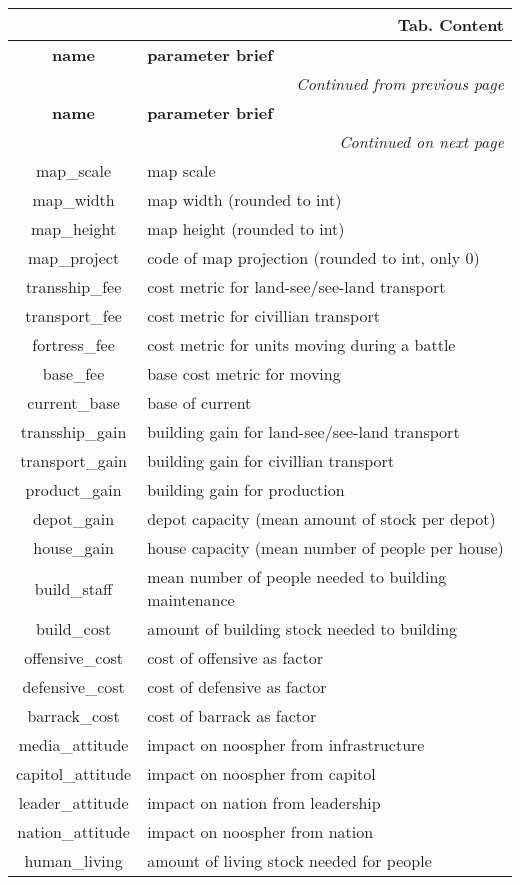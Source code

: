 \documentclass[a4paper,oneside,titlepage]{report}
\newcommand*{\LTHeaderII}[3]{
  \multicolumn{2}{r}{\textbf{Tab. \thesubsection} \textbf{#1}}\\    
  \hline
  \textbf{#2} & \textbf{#3}\\
  \hline

  \endfirsthead
  \multicolumn{2}{r}{\textit{Continued from previous page}}\\    
  \hline
  \textbf{#2} & \textbf{#3}\\
  \hline
  \endhead
  \hline
  \multicolumn{2}{r}{\textit{Continued on next page}}\\
  \endfoot
  \hline
  \endlastfoot  
}
\begin{document}
  \vspace{-0.5cm}
  \begin{longtable}{ |c|l| } 
    \LTHeaderII{Content}{name}{parameter brief}                    
    map\_scale  & map scale\\
    map\_width  & map width (rounded to int)\\
    map\_height  & map height (rounded to int)\\
    map\_project  & code of map projection (rounded to int, only 0)\\
    \hline
    transship\_fee  & cost metric for land-see$/$see-land transport\\
    transport\_fee  & cost metric for civillian transport\\
    fortress\_fee  & cost metric for units moving during a battle\\      
    base\_fee  & base cost metric for moving\\      
    current\_base  & base of current\\      
    \hline
    transship\_gain  & building gain for land-see$/$see-land transport\\
    transport\_gain  & building gain for civillian transport\\
    product\_gain  & building gain for production\\
    depot\_gain  & depot capacity (mean amount of stock per depot)\\      
    house\_gain  & house capacity (mean number of people per house)\\      
    \hline
    build\_staff & mean number of people needed to building maintenance\\      
    build\_cost & amount of building stock needed to building\\      
    \hline
    offensive\_cost & cost of offensive as factor\\      
    defensive\_cost & cost of defensive as factor\\      
    barrack\_cost  & cost of barrack as factor\\      
    \hline
    media\_attitude & impact on noospher from infrastructure\\      
    capitol\_attitude & impact on noospher from capitol\\      
    leader\_attitude & impact on nation from leadership\\      
    nation\_attitude & impact on noospher from nation\\      
    \hline
    human\_living & amount of living stock needed for people\\      

\end{longtable}
\end{document}
